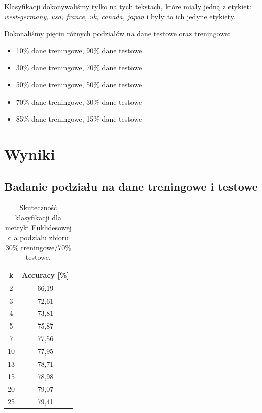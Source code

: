 \documentclass{classrep}
\begin{document}
Klasyfikacji dokonywaliśmy tylko na tych tekstach, które miały jedną z etykiet: \textsl{west-germany, usa, france, uk, canada, japan} i były to ich jedyne etykiety.

Dokonaliśmy pięciu różnych podziałów na dane testowe oraz treningowe:
\begin{itemize}
\item 10\% dane treningowe, 90\% dane testowe
\item 30\% dane treningowe, 70\% dane testowe
\item 50\% dane treningowe, 50\% dane testowe
\item 70\% dane treningowe, 30\% dane testowe
\item 85\% dane treningowe, 15\% dane testowe
\end{itemize}

\section{Wyniki} %
\subsection{Badanie podziału na dane treningowe i testowe}

\begin{table}[h!]
	\centering
	\begin{tabular} {c c}
		\hline
		\textbf{k} & \textbf{Accuracy [\%]} \\ [0.5ex] 
		\hline
		\hline 
		2 & 66,19 \\ 
		3 & 72,61 \\
		4 & 73,81 \\
		5 & 75,87 \\
		7 & 77,56 \\
		10 & 77,95  \\
		13 & 78,71 \\ 
		15 & 78,98 \\
		20 & 79,07 \\
		25 & 79,41 \\
		\hline
	\end{tabular}
	\caption{Skuteczność klasyfikacji dla metryki Euklidesowej dla podziału zbioru 30\% treningowe/70\% testowe. }
\end{table}
\end{document}
